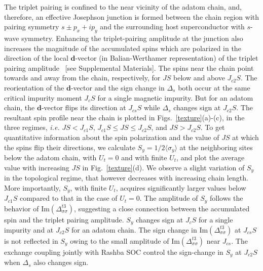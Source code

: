 \documentclass[aps,prl,reprint,nobibnotes]{revtex4-1}
\begin{document}
The triplet pairing is confined to the near vicinity of the adatom chain, and, therefore, an effective Josephson junction is formed between the chain region with pairing symmetry $s \pm p_x + ip_y$ and the surrounding host superconductor with $s$-wave symmetry. Enhancing the triplet-pairing amplitude at the junction also increases the magnitude of the accumulated spins which are polarized in the direction of the local $\mathbf{d}$-vector (in Balian-Werthamer representation) of the triplet pairing amplitude~\cite{PhysRevLett.101.187003,PhysRevB.80.024504} [see Supplemental Materials]. The spins near the chain point towards and away from the chain, respectively, for $JS$ below and above $J_{c2}S$. The reorientation of the $\mathbf{d}$-vector and the sign change in $\Delta_s$ both occur at the same critical impurity moment $J_cS$ for a single magnetic impurity. But for an adatom chain, the $\mathbf{d}$-vector flips its direction at $J_{cs}S$ while $\Delta_s$ changes sign at $J_{c2}S$. The resultant spin profile near the chain is plotted in Figs.~\ref{texture}(a)-(c), in the three regimes, \textit{i.e.} $JS<J_{c1}S$, $J_{c1}S \leq JS \leq J_{c2}S$, and $JS>J_{c2}S$. To get quantitative information about the spin polarization and the value of $JS$ at which the spins flip their directions, we calculate $S_y=1/2\langle \sigma_y \rangle$ at the neighboring sites below the adatom chain, with $U_t=0$ and with finite $U_t$, and plot the average value with increasing $JS$ in Fig.~\ref{texture}(d). We observe a slight variation of $S_y$ in the topological regime, that however decreases with increasing chain length. More importantly, $S_y$, with finite $U_t$, acquires significantly larger values below $J_{c1}S$ compared to that in the case of $U_t=0$. The amplitude of $S_y$ follows the behavior of Im$(\Delta_{\sigma \sigma}^{t3})$, suggesting a close connection between the accumulated spin and the triplet pairing amplitude. $S_y$ changes sign at $J_{c}S$ for a single impurity and at $J_{c2}S$ for an adatom chain. The sign change in Im$(\Delta_{\sigma \sigma}^{t3})$ at $J_{cs}S$ is not reflected in $S_y$ owing to the small amplitude of Im$(\Delta_{\sigma \sigma}^{t3})$ near $J_{cs}$. The exchange coupling jointly with Rashba SOC control the sign-change in $S_y$ at $J_{c2}S$ when $\Delta_s$ also changes sign. 
\end{document}
